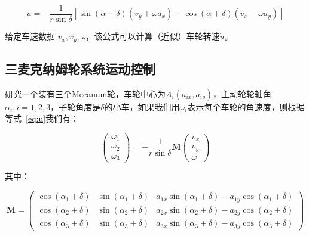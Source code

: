\begin{equation}
    \label{eq:u}
    \dot{u}=-\frac{1}{r \sin \delta}\left[\sin (\alpha+\delta)\left(v_{y}+\omega a_{x}\right)+\cos (\alpha+\delta)\left(v_{x}-\omega a_{y}\right)\right]
\end{equation}

给定车速数据 $v_{x}, v_{y}, \omega$，该公式可以计算（近似）车轮转速$\dot{u}$。

\subsection{三麦克纳姆轮系统运动控制}

研究一个装有三个Mecanum轮，车轮中心为$A_{i}\left(a_{i x}, a_{i y}\right)$，主动轮轮轴角$\alpha_{i}, i=1,2,3$，子轮角度是$\delta$的小车，如果我们用$\omega_i$表示每个车轮的角速度，则根据等式~\ref{eq:u}我们有：

\begin{equation}
    \label{eq:inverse}
    \left(\begin{array}{l}
    {\omega_{1}} \\
    {\omega_{2}} \\
    {\omega_{3}}
    \end{array}\right)=-\frac{1}{r \sin \delta} \mathbf{M}\left(\begin{array}{c}
    {v_{x}} \\
    {v_{y}} \\
    {\omega}
    \end{array}\right)
\end{equation}

其中：

\begin{equation}
    \mathbf{M}=\left(\begin{array}{ccc}
    {\cos \left(\alpha_{1}+\delta\right)} & {\sin \left(\alpha_{1}+\delta\right)} & {a_{1 x} \sin \left(\alpha_{1}+\delta\right)-a_{1 y} \cos \left(\alpha_{1}+\delta\right)} \\
    {\cos \left(\alpha_{2}+\delta\right)} & {\sin \left(\alpha_{2}+\delta\right)} & {a_{2 x} \sin \left(\alpha_{2}+\delta\right)-a_{2 y} \cos \left(\alpha_{2}+\delta\right)} \\
    {\cos \left(\alpha_{3}+\delta\right)} & {\sin \left(\alpha_{3}+\delta\right)} & {a_{3 x} \sin \left(\alpha_{3}+\delta\right)-a_{3 y} \cos \left(\alpha_{3}+\delta\right)}
    \end{array}\right)
\end{equation}

